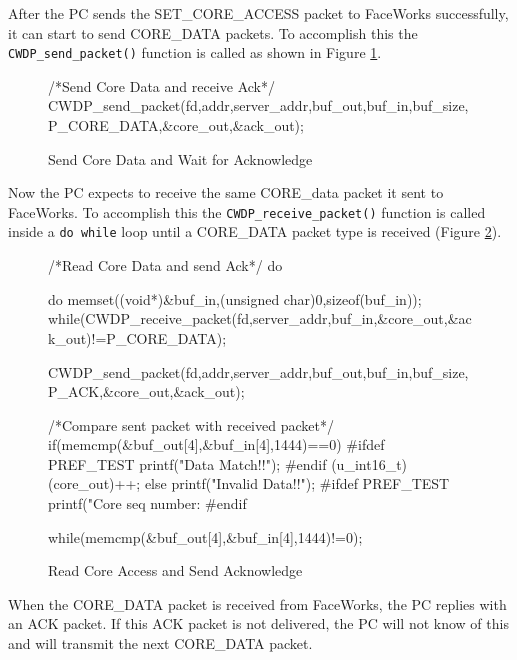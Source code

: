 \documentclass[defaultstyle,10pt,master,Helvetica]{thesis}
\begin{document}
After the PC sends the SET\_CORE\_ACCESS packet to FaceWorks successfully, it can start to send CORE\_DATA packets. To accomplish this the \texttt{CWDP\_send\_packet()} function is called as shown in Figure \ref{chp3:code_coredata}.

\begin{figure}[h]
\begin{boxedverbatim}
/*Send Core Data and receive Ack*/
CWDP_send_packet(fd,addr,server_addr,buf_out,buf_in,buf_size,P_CORE_DATA,&core_out,&ack_out);
\end{boxedverbatim}
\caption{Send Core Data and Wait for Acknowledge}
\label{chp3:code_coredata}
\end{figure}

\clearpage
Now the PC expects to receive the same CORE\_data packet it sent to FaceWorks. To accomplish this the \texttt{CWDP\_receive\_packet()} function is called inside a {\tt do while} loop until a CORE\_DATA packet type is received (Figure \ref{chp3:code_readca_sndack}).
\vspace{3cm}
\begin{figure}[h]
\begin{boxedverbatim}
/*Read Core Data and send Ack*/
do{
    do{
        memset((void*)&buf_in,(unsigned char)0,sizeof(buf_in));
      }while(CWDP_receive_packet(fd,server_addr,buf_in,&core_out,&ack_out)!=P_CORE_DATA);

      CWDP_send_packet(fd,addr,server_addr,buf_out,buf_in,buf_size,P_ACK,&core_out,&ack_out);

      /*Compare sent packet with received packet*/
      if(memcmp(&buf_out[4],&buf_in[4],1444)==0)
      {
#ifdef PREF_TEST
            printf("Data Match!!\n");
#endif
            (u_int16_t)(core_out)++;
      }
      else
      {     
            printf("Invalid Data!!\n");
      }
#ifdef PREF_TEST
      printf("Core seq number: %
#endif
}while(memcmp(&buf_out[4],&buf_in[4],1444)!=0);
\end{boxedverbatim}
\caption{Read Core Access and Send Acknowledge}
\label{chp3:code_readca_sndack}
\end{figure}

\clearpage

When the CORE\_DATA packet is received from FaceWorks, the PC replies with an \ac{ACK} packet. If this \ac{ACK} packet is not delivered, the PC will not know of this and will transmit the next CORE\_DATA packet.
\end{document}
